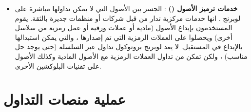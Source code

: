 \documentclass[12pt, a4paper, leqno]{report}
\theoremstyle{plain}
\theoremstyle{definition}
\begin{document}
\begin{multicols}{2}
\begin{otherlanguage}{arabic}
\begin{itemize}
  \item \textbf{خدمات ترميز الأصول ()} : الجسر بين الأصول التي لا يمكن تداولها مباشرة على لوبرنج . انها خدمات مركزية تدار من قبل شركات أو منظمات جديرة بالثقة. يقوم المستخدمون بإيداع الأصول (مادية أو عملات ورقية أو عمل رمزية من سلاسل أخرى) ويحصلوا على العملات الرمزية التي تم إصدارها ، والتي يمكن استبدالها بالإيداع في المستقبل. لا يعد لوبرنج بروتوكول تداول عبر السلسلة (حتى يوجد حل مناسب) ، ولكن   تمكن من تداول العملات الرمزية  مع الأصول المادية وكذلك الأصول على تقنيات البلوكشين الأخرى.
\end{itemize}
\end{otherlanguage}
\end{multicols}

\chapter{عملية منصات التداول}
\end{document}

